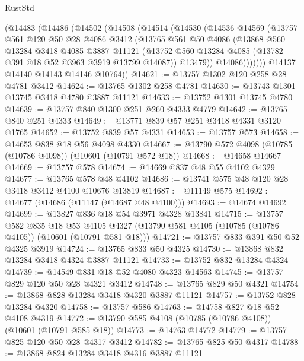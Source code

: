 \begin{lexlean}{RustStd}
\begin{coremodule}
      (@14483
        (@14486
          (@14502
            (@14508
              (@14514
                (@14530
                  (@14536
                    @14569
                    (@13757
                      @561
                      @120
                      @50
                      @28
                      @4086
                      @3412
                      (@13765
                        @561
                        @50
                        @4086
                        (@13868
                          @560
                          @13284
                          @3418
                          @4085
                          @3887
                          @11121
                          (@13752 @560 @13284 @4085 (@13782 @391 @18 @52 @3963 @3919 @13799 @14087))
                          @13479))
                      @14086)))))))
        @14137
        @14140
        @14143
        @14146
        @10764))
@14621 := @13757 @1302 @120 @258 @28 @4781 @3412
@14624 := @13765 @1302 @258 @4781
@14630 := @13743 @1301 @13745 @3418 @4780 @3887 @11121
@14633 := @13752 @1301 @13745 @4780
@14639 := @13757 @840 @1300 @251 @260 @4333 @4779
@14642 := @13765 @840 @251 @4333
@14649 := @13771 @839 @57 @251 @3418 @4331 @3120 @1765
@14652 := @13752 @839 @57 @4331
@14653 := @13757 @573
@14658 := @14653 @838 @18 @56 @4098 @4330
@14667 := @13790 @572 @4098 (@10785 (@10786 @4098)) (@10601 (@10791 @572 @18))
@14668 := @14658 @14667
@14669 := @13757 @578
@14674 := @14669 @837 @48 @55 @4102 @4329
@14677 := @13765 @578 @48 @4102
@14686 := @13741 @575 @48 @120 @28 @3418 @3412 @4100 @10676 @13819
@14687 := @11149 @575
@14692 := @14677 (@14686 (@11147 (@14687 @48 @4100)))
@14693 := @14674 @14692
@14699 := @13827 @836 @18 @54 @3971 @4328 @13841
@14715 := @13757
    @582
    @835
    @18
    @53
    @4105
    @4327
    (@13790 @581 @4105 (@10785 (@10786 @4105)) (@10601 (@10791 @581 @18)))
@14721 := @13757 @833 @391 @50 @52 @4325 @3919
@14724 := @13765 @833 @50 @4325
@14730 := @13868 @832 @13284 @3418 @4324 @3887 @11121
@14733 := @13752 @832 @13284 @4324
@14739 := @14549 @831 @18 @52 @4080 @4323 @14563
@14745 := @13757 @829 @120 @50 @28 @4321 @3412
@14748 := @13765 @829 @50 @4321
@14754 := @13868 @828 @13284 @3418 @4320 @3887 @11121
@14757 := @13752 @828 @13284 @4320
@14758 := @13757 @586
@14763 := @14758 @827 @18 @52 @4108 @4319
@14772 := @13790 @585 @4108 (@10785 (@10786 @4108)) (@10601 (@10791 @585 @18))
@14773 := @14763 @14772
@14779 := @13757 @825 @120 @50 @28 @4317 @3412
@14782 := @13765 @825 @50 @4317
@14788 := @13868 @824 @13284 @3418 @4316 @3887 @11121

\end{coremodule}
\end{lexlean}
